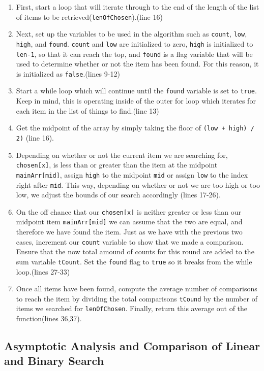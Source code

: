 \documentclass[letterpaper, 10pt]{article}
\begin{document}
\begin{enumerate}
    \item First, start a loop that will iterate through to the end of the length of the list of items to be retrieved(\texttt{lenOfChosen}).(line 16)
    \item Next, set up the variables to be used in the algorithm such as \texttt{count}, \texttt{low}, \texttt{high}, and \texttt{found}. \texttt{count} and \texttt{low} are initialized to zero,  \texttt{high} is initialized to \texttt{len-1}, so that it can reach the top, and \texttt{found} is a flag variable that will be used to determine whether or not the item has been found. For this reason, it is initialized as \texttt{false}.(lines 9-12)
    \item Start a while loop which will continue until the \texttt{found} variable is set to \texttt{true}. Keep in mind, this is operating inside of the outer for loop which iterates for each item in the list of things to find.(line 13)
    \item Get the midpoint of the array by simply taking the floor of \texttt{(low + high) / 2)} (line 16).
    \item Depending on whether or not the current item we are searching for, \texttt{chosen[x]}, is less than or greater than the item at the midpoint \texttt{mainArr[mid]}, assign \texttt{high} to the midpoint \texttt{mid} or assign \texttt{low} to the index right after \texttt{mid}. This way, depending on whether or not we are too high or too low, we adjust the bounds of our search accordingly (lines 17-26).
    \item On the off chance that our \texttt{chosen[x]} is neither greater or less than our midpoint item \texttt{mainArr[mid]} we can assume that the two are equal, and therefore we have found the item. Just as we have with the previous two cases, increment our \texttt{count} variable to show that we made a comparison. Ensure that the now total amound of counts for this round are added to the sum variable \texttt{tCount}. Set the \texttt{found} flag to \texttt{true} so it breaks from the while loop.(lines 27-33)
    \item Once all items have been found, compute the average number of comparisons to reach the item by dividing the total comparisons \texttt{tCound} by the number of items we searched for \texttt{lenOfChosen}. Finally, return this average out of the function(lines 36,37).
\end{enumerate}

\subsection{Asymptotic Analysis and Comparison of Linear and Binary Search}
\end{document}
